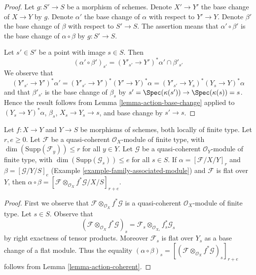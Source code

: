 \begin{proof}
Let $g : S' \to S$ be a morphism of schemes.
Denote $X' \to Y'$ the base change of $X \to Y$ by $g$. Denote
$\alpha'$ the base change of $\alpha$ with respect to $Y' \to Y$.
Denote $\beta'$ the base change of $\beta$ with respect to $S' \to S$.
The assertion means that $\alpha' \circ \beta'$ is the base change
of $\alpha \circ \beta$ by $g : S' \to S$.

\medskip\noindent
Let $s' \in S'$ be a point with image $s \in S$. Then
$$
(\alpha' \circ \beta')_{s'} = (Y'_{s'} \to Y')^*\alpha' \cap \beta'_{s'}
$$
We observe that
$$
(Y'_{s'} \to Y')^*\alpha' =
(Y'_{s'} \to Y')^*(Y' \to Y)^*\alpha =
(Y'_{s'} \to Y_s)^*(Y_s \to Y)^*\alpha
$$
and that $\beta'_{s'}$ is the base change of $\beta_s$ by
$s' = \Spec(\kappa(s')) \to \Spec(\kappa(s)) = s$.
Hence the result follows from Lemma \ref{lemma-action-base-change}
applied to $(Y_s \to Y)^*\alpha$, $\beta_s$,
$X_s \to Y_s \to s$, and base change by $s' \to s$.
\end{proof}

\begin{lemma}
\label{lemma-construction-coherent}
Let $f : X \to Y$ and $Y \to S$ be morphisms of schemes, both locally of
finite type. Let $r, e \geq 0$. Let $\mathcal{F}$ be a quasi-coherent
$\mathcal{O}_X$-module of finite type, with
$\dim(\text{Supp}(\mathcal{F}_y)) \leq r$ for all $y \in Y$.
Let $\mathcal{G}$  be a quasi-coherent $\mathcal{O}_Y$-module of finite
type, with $\dim(\text{Supp}(\mathcal{G}_s)) \leq e$ for all $s \in S$.
If $\alpha = [\mathcal{F}/X/Y]_r$ and $\beta = [\mathcal{G}/Y/S]_e$
(Example \ref{example-family-associated-module}) and $\mathcal{F}$
is flat over $Y$, then $\alpha \circ \beta =
[\mathcal{F} \otimes_{\mathcal{O}_X} f^*\mathcal{G}/X/S]_{r + e}$.
\end{lemma}

\begin{proof}
First we observe that $\mathcal{F} \otimes_{\mathcal{O}_X} f^*\mathcal{G}$
is a quasi-coherent $\mathcal{O}_X$-module of finite type.
Let $s \in S$. Observe that
$$
(\mathcal{F} \otimes_{\mathcal{O}_X} f^*\mathcal{G})_s =
\mathcal{F}_s \otimes_{\mathcal{O}_{X_s}} f_s^*\mathcal{G}_s
$$
by right exactness of tensor products. Moreover $\mathcal{F}_s$
is flat over $Y_s$ as a base change of a flat module. Thus the equality
$(\alpha \circ \beta)_s =
[(\mathcal{F} \otimes_{\mathcal{O}_X} f^*\mathcal{G})_s]_{r + e}$
follows from Lemma \ref{lemma-action-coherent}.
\end{proof}

